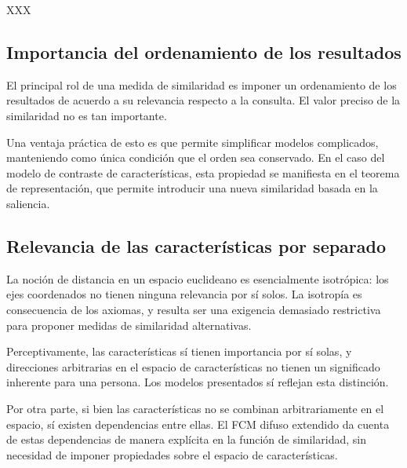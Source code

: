 \documentclass[spanish]{article}
\begin{document}
XXX


\subsection{Importancia del ordenamiento de los resultados}
El principal rol de una medida de similaridad es imponer un ordenamiento de los
resultados de acuerdo a su relevancia respecto a la consulta.  El valor preciso
de la similaridad no es tan importante.

Una ventaja práctica de esto es que permite simplificar modelos complicados,
manteniendo como única condición que el orden sea conservado.  En el caso del
modelo de contraste de características, esta propiedad se manifiesta en el
teorema de representación, que permite introducir una nueva similaridad basada
en la saliencia.

\subsection{Relevancia de las características por separado}
La noción de distancia en un espacio euclideano es esencialmente isotrópica: los
ejes coordenados no tienen ninguna relevancia por sí solos.  La isotropía es
consecuencia de los axiomas, y resulta ser una exigencia demasiado restrictiva
para proponer medidas de similaridad alternativas.

Perceptivamente, las características sí tienen importancia por sí
solas, y direcciones arbitrarias en el espacio de características no tienen
un significado inherente para una persona.  Los modelos presentados sí reflejan
esta distinción.

Por otra parte, si bien las características no se combinan arbitrariamente en el
espacio, sí existen dependencias entre ellas.  El FCM difuso extendido da cuenta
de estas dependencias de manera explícita en la función de similaridad, sin
necesidad de imponer propiedades sobre el espacio de características.




\end{document}
